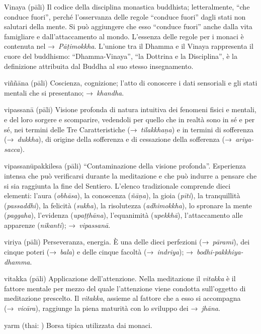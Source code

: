 \begin{glossarydescription}
\item[Vinaya] (pāli) Il codice della disciplina monastica buddhista;
  letteralmente, ``che conduce fuori'', perché l'osservanza delle regole
  ``conduce fuori'' dagli stati non salutari della mente. Si può aggiungere che
  esso ``conduce fuori'' anche dalla vita famigliare e dall'attaccamento al
  mondo. L'essenza delle regole per i monaci è contenuta nel
  →~\emph{Pāṭimokkha}. L'unione tra il Dhamma e il Vinaya rappresenta il cuore
  del buddhismo: ``Dhamma-Vinaya'', ``la Dottrina e la Disciplina'', è la
  definizione attribuita dal Buddha al suo stesso insegnamento.

\item[viññāna] (pāli) Coscienza, cognizione; l'atto di conoscere i dati
  sensoriali e gli stati mentali che si presentano; →~\emph{khandha}.

\item[vipassanā] (pāli) Visione profonda di natura intuitiva dei fenomeni fisici
  e mentali, e del loro sorgere e scomparire, vedendoli per quello che in realtà
  sono in sé e per sé, nei termini delle Tre Caratteristiche
  (→~\emph{tilakkhaṇa}) e in termini di sofferenza (→~\emph{dukkha}), di origine
  della sofferenza e di cessazione della sofferenza (→~\emph{ariya-sacca}).

\item[vipassanūpakkilesa] (pāli) ``Contaminazione della visione profonda''.
  Esperienza intensa che può verificarsi durante la meditazione e che può
  indurre a pensare che si sia raggiunta la fine del Sentiero. L'elenco
  tradizionale comprende dieci elementi: l'aura (\emph{obhāsa}), la conoscenza
  (\emph{ñāṇa}), la gioia (\emph{pīti}), la tranquillità (\emph{passaddhi}), la
  felicità (\emph{sukha}), la risolutezza (\emph{adhimokkha}), lo spronare la
  mente (\emph{paggaha}), l'evidenza (\emph{upaṭṭhāna}), l'equanimità
  (\emph{upekkhā}), l'attaccamento alle apparenze (\emph{nikanti});
  →~\emph{vipassanā}.

\item[viriya] (pāli) Perseveranza, energia. È una delle dieci perfezioni
  (→~\emph{pāramī}), dei cinque poteri (→~\emph{bala}) e delle cinque facoltà
  (→~\emph{indriya}); →~\emph{bodhi-pakkhiya-dhamma}.

\item[vitakka] (pāli) Applicazione dell'attenzione. Nella meditazione il
  \emph{vitakka} è il fattore mentale per mezzo del quale l'attenzione viene
  condotta sull'oggetto di meditazione prescelto. Il \emph{vitakka}, assieme al
  fattore che a esso si accompagna (→~\emph{vicāra}), raggiunge la piena
  maturità con lo sviluppo dei →~\emph{jhāna}.



\item[yarm] (thai: ) Borsa tipica utilizzata dai monaci.

\end{glossarydescription}

